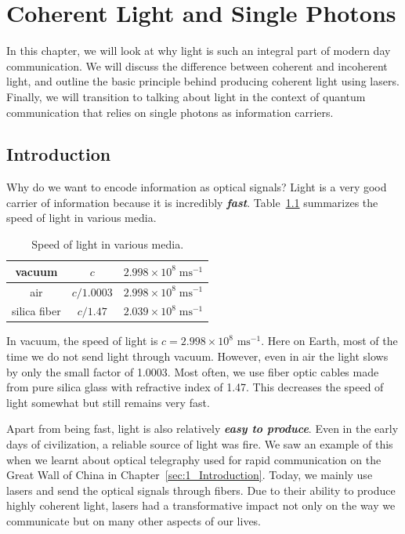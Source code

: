 \chapter{Coherent Light and Single Photons}
\label{sec:5_coherent_light_single_photons}

In this chapter, we will look at why light is such an integral part of modern day communication.
We will discuss the difference between coherent and incoherent light, and outline the basic principle behind producing coherent light using lasers.
Finally, we will transition to talking about light in the context of quantum communication that relies on single photons as information carriers.

\section{Introduction}
\label{sec:5-1_intoduction}

Why do we want to encode information as optical signals?
Light is a very good carrier of information because it is incredibly \textit{\textbf{fast}}.
Table~\ref{tab:5-1_speed_light} summarizes the speed of light in various media.
\begin{table}[b!]
    \centering
    \begin{tabular}{c|c|c}
        vacuum & $c$ & $2.998\times10^{8} \; \text{ms}^{-1}$  \\
        \hline
        air & $c/1.0003$ & $2.998\times10^{8} \; \text{ms}^{-1}$  \\
        \hline
        silica fiber & $c/1.47$ & $2.039\times10^{8} \; \text{ms}^{-1}$
    \end{tabular}
    \caption[Speed of light]{Speed of light in various media.}
    \label{tab:5-1_speed_light}
\end{table}
In vacuum, the speed of light is $c=2.998\times 10^8$ $\text{ms}^{-1}$.
Here on Earth, most of the time we do not send light through vacuum.
However, even in air the light slows by only the small factor of 1.0003.
Most often, we use fiber optic cables made from pure silica glass with refractive index of 1.47.
This decreases the speed of light somewhat but still remains very fast.

Apart from being fast, light is also relatively \textit{\textbf{easy to produce}}.
Even in the early days of civilization, a reliable source of light was fire.
We saw an example of this when we learnt about optical telegraphy used for rapid communication on the Great Wall of China in Chapter~\ref{sec:1_Introduction}.
Today, we mainly use lasers and send the optical signals through fibers.
Due to their ability to produce highly coherent light, lasers had a transformative impact not only on the way we communicate but on many other aspects of our lives. 

